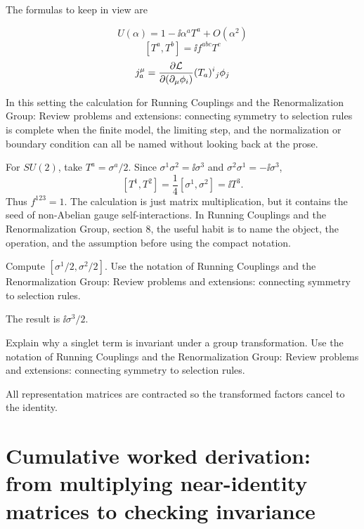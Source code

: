 The formulas to keep in view are

\[
  U(\alpha)=1-\ii\alpha^aT^a+O(\alpha^2)
\]
\[
  [T^a,T^b]=\ii f^{abc}T^c
\]
\[
  j^\mu_a=\frac{\partial\mathcal L}{\partial(\partial_\mu\phi_i)}(T_a)^i{}_j\phi_j
\]

In this setting the calculation for Running Couplings and the Renormalization Group: Review problems and extensions: connecting symmetry to selection rules is complete when the finite model, the limiting step, and the normalization or boundary condition can all be named without looking back at the prose.




\begin{example}
For \(SU(2)\), take \(T^a=\sigma^a/2\).  Since \(\sigma^1\sigma^2=\ii\sigma^3\) and \(\sigma^2\sigma^1=-\ii\sigma^3\),
\[
  [T^1,T^2]=\frac14[\sigma^1,\sigma^2]=\ii T^3.
\]
Thus \(f^{123}=1\).  The calculation is just matrix multiplication, but it contains the seed of non-Abelian gauge self-interactions.  In Running Couplings and the Renormalization Group, section 8, the useful habit is to name the object, the operation, and the assumption before using the compact notation.
\end{example}



\begin{exercise}
Compute \([\sigma^1/2,\sigma^2/2]\).  Use the notation of Running Couplings and the Renormalization Group: Review problems and extensions: connecting symmetry to selection rules.
\begin{answer}
The result is \(\ii\sigma^3/2\).
\end{answer}
\end{exercise}

\begin{exercise}
Explain why a singlet term is invariant under a group transformation.  Use the notation of Running Couplings and the Renormalization Group: Review problems and extensions: connecting symmetry to selection rules.
\begin{answer}
All representation matrices are contracted so the transformed factors cancel to the identity.
\end{answer}
\end{exercise}



\section{Cumulative worked derivation: from multiplying near-identity matrices to checking invariance}

